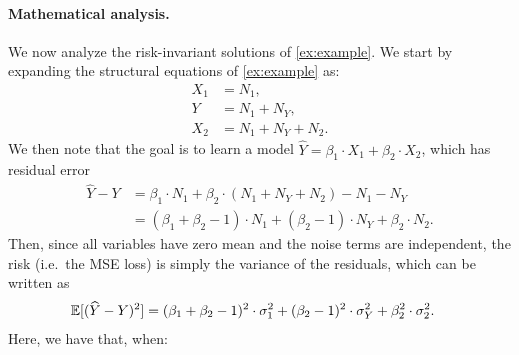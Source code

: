 \documentclass{article}
\begin{document}
\paragraph{Mathematical analysis.} We now analyze the risk-invariant solutions of \cref{ex:example}. We start by expanding the structural equations of \cref{ex:example} as:
\begin{align*}
    X_1 &= N_1, \\
    Y &= N_1 + N_Y, \\
    X_2 &= N_1 + N_Y + N_2.
\end{align*}
We then note that the goal is to learn a model $\widehat{Y} = \beta_1 \cdot X_1 + \beta_2 \cdot X_2$, which has residual error
\begin{align*}
    \widehat{Y} - Y &= \beta_1 \cdot N_1 + \beta_2 \cdot (N_1 + N_Y + N_2) - N_1 - N_Y \\
    &= (\beta_1 + \beta_2 - 1)\cdot N_1 + (\beta_2 - 1)\cdot N_Y + \beta_2 \cdot N_2.
\end{align*}
Then, since all variables have zero mean and the noise terms are independent, the risk (i.e.\ the MSE loss) is simply the variance of the residuals, which can be written as
\begin{align*}
    \mathbb{E}[(\widehat{Y} - Y)^2] &= (\beta_1 + \beta_2 - 1)^2\cdot \sigma^2_1 + (\beta_2 - 1)^2\cdot \sigma^2_Y + \beta_2^2 \cdot \sigma^2_2.
\end{align*}
Here, we have that, when:
\end{document}
